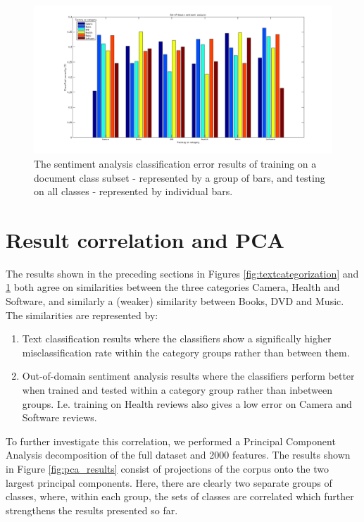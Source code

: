\begin{figure}[h!]
\centering
\includegraphics[width=1\linewidth]{../Plottar/outofdomain.png}
\caption{The sentiment analysis classification error results of training on a document class subset - represented by a group of bars, and testing on all classes - represented by individual bars.}
\label{fig:outofdomain}
\end{figure}  

\section{Result correlation and PCA}
The results shown in the preceding sections in Figures \ref{fig:textcategorization} and \ref{fig:outofdomain} both agree on similarities between the three categories Camera, Health and Software, and similarly a (weaker) similarity between Books, DVD and Music. The similarities are represented by:
\begin{enumerate}
  \item Text classification results where the classifiers show a significally higher misclassification rate within the category groups rather than between them.
  \item Out-of-domain sentiment analysis results where the classifiers perform better when trained and tested within a category group rather than inbetween groups. I.e. training on Health reviews also gives a low error on Camera and Software reviews.
\end{enumerate}

To further investigate this correlation, we performed a Principal Component Analysis decomposition of the full dataset and 2000 features. The results shown in Figure \ref{fig:pca_results} consist of projections of the corpus onto the two largest principal components. Here, there are clearly two separate groups of classes, where, within each group, the sets of classes are correlated which further strengthens the results presented so far.


